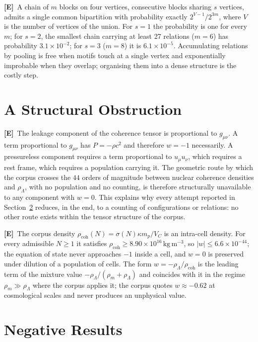 \documentclass[11pt,a4paper]{article}
\theoremstyle{plain}
\theoremstyle{definition}
\theoremstyle{remark}
\newcommand{\statE}{\textbf{[E]}}
\begin{document}
\statE\ A chain of $m$ blocks on four vertices, consecutive blocks sharing $s$ vertices, admits a single common bipartition with probability exactly $2^{V-1}/2^{3m}$, where $V$ is the number of vertices of the union. For $s=1$ the probability is one for every $m$; for $s=2$, the smallest chain carrying at least 27 relations ($m=6$) has probability $3.1\times10^{-2}$; for $s=3$ ($m=8$) it is $6.1\times10^{-5}$. Accumulating relations by pooling is free when motifs touch at a single vertex and exponentially improbable when they overlap; organising them into a dense structure is the costly step.

\section{A Structural Obstruction}
\label{sec:obstruction}

\statE\ The leakage component of the coherence tensor is proportional to $g_{\mu\nu}$. A term proportional to $g_{\mu\nu}$ has $P=-\rho c^2$ and therefore $w=-1$ necessarily. A pressureless component requires a term proportional to $u_\mu u_\nu$, which requires a rest frame, which requires a population carrying it. The geometric route by which the corpus crosses the $44$ orders of magnitude between nuclear coherence densities and $\rho_\Lambda$, with no population and no counting, is therefore structurally unavailable to any component with $w=0$. This explains why every attempt reported in Section~\ref{sec:negative} reduces, in the end, to a counting of configurations or relations: no other route exists within the tensor structure of the corpus.

\statE\ The corpus density $\rho_{\mathrm{coh}}(N)=\sigma(N)\kappa m_p/V_C$ is an intra-cell density. For every admissible $N\ge1$ it satisfies $\rho_{\mathrm{coh}}\ge8.90\times10^{16}\,\mathrm{kg\,m^{-3}}$, so $|w|\le6.6\times10^{-44}$; the equation of state never approaches $-1$ inside a cell, and $w=0$ is preserved under dilution of a population of cells. The form $w=-\rho_\Lambda/\rho_{\mathrm{coh}}$ is the leading term of the mixture value $-\rho_\Lambda/(\rho_m+\rho_\Lambda)$ and coincides with it in the regime $\rho_m\gg\rho_\Lambda$ where the corpus applies it; the corpus quotes $w\approx-0.62$ at cosmological scales and never produces an unphysical value.

\section{Negative Results}
\label{sec:negative}
\end{document}
